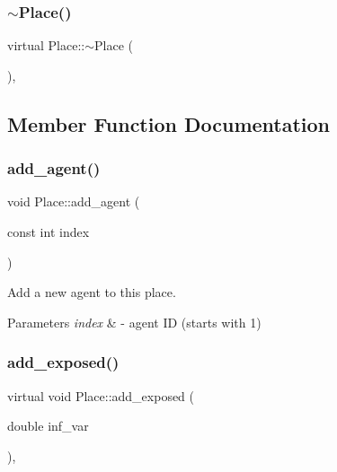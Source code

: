 \subsubsection{\texorpdfstring{$\sim$\+Place()}{~Place()}}
{\footnotesize\ttfamily virtual Place\+::$\sim$\+Place (\begin{DoxyParamCaption}{ }\end{DoxyParamCaption})\hspace{0.3cm}{\ttfamily [virtual]}, {\ttfamily [default]}}



\subsection{Member Function Documentation}
\mbox{\label{classPlace_a42d0f8ea98161eb76ebebb4f0946b474}} 
\subsubsection{\texorpdfstring{add\+\_\+agent()}{add\_agent()}}
{\footnotesize\ttfamily void Place\+::add\+\_\+agent (\begin{DoxyParamCaption}\item[{const int}]{index }\end{DoxyParamCaption})\hspace{0.3cm}{\ttfamily [inline]}}



Add a new agent to this place. 


\begin{DoxyParams}{Parameters}
{\em index} & -\/ agent ID (starts with 1) \\
\hline
\end{DoxyParams}
\mbox{\label{classPlace_a96444ff0aa08a921598d0afb9c00cec8}} 
\subsubsection{\texorpdfstring{add\+\_\+exposed()}{add\_exposed()}}
{\footnotesize\ttfamily virtual void Place\+::add\+\_\+exposed (\begin{DoxyParamCaption}\item[{double}]{inf\+\_\+var }\end{DoxyParamCaption})\hspace{0.3cm}{\ttfamily [inline]}, {\ttfamily [virtual]}}



